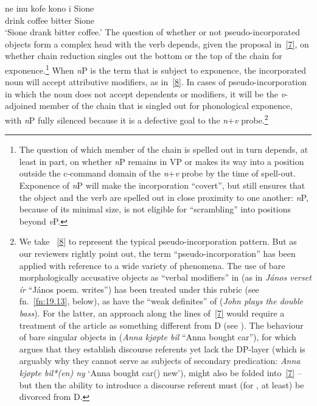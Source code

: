 \documentclass[output=paper]{langsci/langscibook}
\begin{document}
\begin{refcontext}
\ea {}
    \sn\gll ne inu kofe kono i Sione \label{8}\\
    \Pst{} drink coffee bitter \Abs{} Sione\\
    \glt \enquote*{Sione drank bitter coffee.}
\z
The question of whether or not pseudo-incorporated objects form a complex head
with the verb depends, given the proposal in~\eqref{7}, on whether chain
reduction singles out the bottom or the top of the chain for
exponence.\footnote{The question of which member of the chain is spelled out in
    turn depends, at least in part, on whether \emph{n}P remains in VP or makes
    its way into a position outside the c-command domain of the
    \emph{n}+\emph{v} probe by the time of spell-out.  Exponence of \emph{n}P
    will make the incorporation \enquote{covert}, but still ensures that the object
    and the verb are spelled out in close proximity to one another: \emph{n}P,
because of its minimal size, is not eligible for \enquote{scrambling} into positions
beyond \emph{v}P.} When \emph{n}P is the term that is subject to exponence, the
incorporated noun will accept attributive modifiers, as in~\eqref{8}. In cases of
pseudo-incorporation in which the noun does not accept dependents or modifiers,
it will be the \emph{v}-adjoined member of the chain that is singled out for
phonological exponence, with \emph{n}P fully silenced because it is a defective
goal to the \emph{n}+\emph{v} probe.\footnote{We take ~\eqref{8} to
    represent the typical pseudo-incorporation pattern. But as our reviewers
    rightly point out, the term \enquote{pseudo-incorporation} has been applied with
    reference to a wide variety of phenomena. The use of bare morphologically
    accusative objects as \enquote{verbal modifiers} in  (as in \emph{János
    verset ír} \enquote{János poem.\Acc{} writes}) has been treated under this
    rubric (see fn.\ \ref{fn:19.13}, below), as have the \enquote{weak definites} of 
    (\emph{John plays the double bass}). For the latter, an approach along the
    lines of~\eqref{7} would require a treatment of the article as something
    different from D (see \citealt{zamparelli}). The behaviour of bare singular
    objects in  (\emph{Anna kj\o{}pte bil} \enquote{Anna bought car}), for
    which \cite{kallullidiss} argues that they establish discourse referents
    yet lack the DP-layer (which is arguably why they cannot serve as subjects
of secondary predication: \emph{Anna kj\o{}pte bil*(en) ny} \enquote*{Anna
bought car(\Def{}) new}), might also be folded into~\eqref{7} -- but then the
ability to introduce a discourse referent must (for , at least) be
divorced from D.\label{fn:19.7}}


\end{refcontext}
\end{document}
